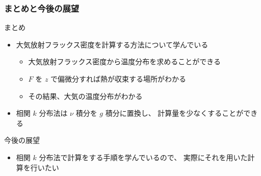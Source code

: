\documentclass[unicode,colorlinks]{beamer}
\begin{document}
\begin{frame}
	\frametitle{まとめと今後の展望}
	\begin{block}{まとめ}
		\begin{itemize}
			\item 大気放射フラックス密度を計算する方法について学んでいる
			\begin{itemize}
				\item 大気放射フラックス密度から温度分布を求めることができる
				\item $F$ を $z$ で偏微分すれば熱が収束する場所がわかる
				\item その結果、大気の温度分布がわかる
			\end{itemize}
			\item 相関 $k$ 分布法は $\nu$ 積分を $g$ 積分に置換し、
				計算量を少なくすることができる
		\end{itemize}
	\end{block}

	\begin{block}{今後の展望}
		\begin{itemize}
			\item 相関 $k$ 分布法で計算をする手順を学んでいるので、
				実際にそれを用いた計算を行いたい
		\end{itemize}
	\end{block}
\end{frame}
\end{document}
